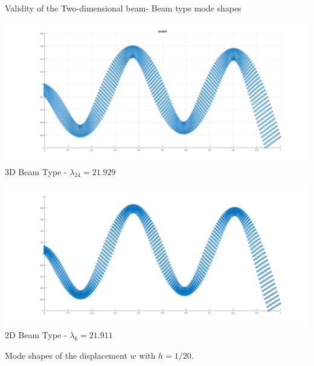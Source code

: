 \documentclass[8pt]{beamer}
\begin{document}
\begin{frame}{Validity of the Two-dimensional beam- Beam type mode shapes}
            \begin{minipage}[b]{0.45\textwidth}
                \includegraphics[width=\textwidth]{3D22.png}
                \\ 3D Beam Type - $\lambda_{24} = 21.929$
                \label{fig:minipage4}
            \end{minipage}
            \hfill
            \begin{minipage}[b]{0.45\textwidth}
                \includegraphics[width=\textwidth]{2D6.png}
                \\ 2D Beam Type - $\lambda_6 = 21.911$
                \label{fig:minipage3}
            \end{minipage}
        
            Mode shapes of the displacement \( w \) with \( h=1/20 \).
        
        \end{frame}
        
\end{document}
